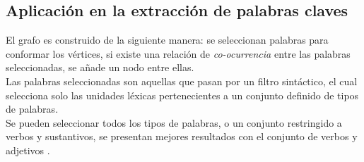 \subsection{Aplicaci\'on en la extracci\'on de palabras claves}
El grafo es construido de la siguiente manera: se seleccionan palabras  para 
conformar los v\'ertices, si existe una relaci\'on de \emph{co-ocurrencia} entre 
las palabras seleccionadas, se a\~nade un nodo entre ellas. \\

Las palabras seleccionadas son aquellas que pasan por un filtro sint\'actico, el cual
selecciona solo las unidades l\'exicas pertenecientes a un conjunto definido de tipos
de palabras. \\

Se pueden seleccionar todos los tipos de palabras, o un conjunto restringido a verbos
y sustantivos, se presentan mejores resultados con el conjunto de verbos y
adjetivos \cite{RMPT04} .

